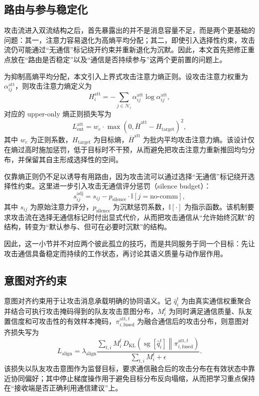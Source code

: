 \subsection{路由与参与稳定化}

攻击流进入双流结构之后，首先暴露出的并不是消息容量不足，而是两个更基础的问题：其一，注意力容易退化为高熵平均分配；其二，即使引入选择性约束，攻击流仍可能通过“无通信”标记绕开约束并重新退化为沉默。因此，本文首先把修正重点放在“路由是否稳定”以及“通信是否持续参与”这两个更前置的问题上。

为抑制高熵平均分配，本文引入上界式攻击注意力熵正则。设攻击注意力权重为 $\alpha^{\text{att}}_{ij}$，则攻击注意力熵定义为
\begin{equation}
H^{\text{att}}_i = -\sum_{j\in\mathcal{N}_i} \alpha^{\text{att}}_{ij} \log \alpha^{\text{att}}_{ij},
\end{equation}
对应的 upper-only 熵正则损失写为
\begin{equation}
L_{\text{ent}}^{\text{att}} = w_e \cdot \max(0, \bar{H}^{\text{att}} - H_{\text{target}})^2,
\end{equation}
其中 $w_e$ 为正则系数，$H_{\text{target}}$ 为目标熵，$\bar{H}^{\text{att}}$ 为批内平均攻击注意力熵。该设计仅在熵过高时施加惩罚，低于目标时不干预，从而避免把攻击注意力重新推回均匀分布，并保留其自主形成选择性的空间。

仅靠熵正则仍不足以诱导有用路由，因为攻击流可以通过选择“无通信”标记绕开选择性约束。这里进一步引入攻击无通信评分惩罚（silence budget）：
\begin{equation}
s_{ij}^{\text{adj}} = s_{ij} - p_{\text{silence}} \cdot \mathbb{I}[j = \text{no-comm}],
\end{equation}
其中 $s_{ij}$ 为原始注意力评分，$p_{\text{silence}}$ 为沉默惩罚系数，$\mathbb{I}[\cdot]$ 为指示函数。该机制要求攻击流在选择无通信标记时付出显式代价，从而把攻击通信从“允许始终沉默”的结构，转变为“默认参与、但可在必要时沉默”的结构。

因此，这一小节并不对应两个彼此孤立的技巧，而是共同服务于同一个目标：先让攻击通信具备稳定而持续的工作状态，再讨论其语义质量与动作层作用。

\subsection{意图对齐约束}

意图对齐约束用于让攻击消息承载明确的协同语义。记 \(\hat{q}_i^t\) 为由真实通信权重聚合并结合可执行攻击掩码得到的队友攻击意图分布，\(M_i^t\) 为同时满足通信质量、队友置信度和可攻击性的有效样本掩码，\(\pi_{i,\text{fused}}^{\text{att},t}\) 为融合通信后的攻击分布，则意图对齐损失写为
\begin{equation}
L_{\text{align}}
=
\lambda_{\text{align}}
\frac{
\sum_{t,i}
M_i^t\,
D_{\mathrm{KL}}
\left(
\operatorname{sg}\!\left[\hat{q}_i^t\right]
\middle\|
\pi_{i,\text{fused}}^{\text{att},t}
\right)
}{
\sum_{t,i} M_i^t + \epsilon
}.
\end{equation}
该损失以队友攻击意图作为监督目标，要求通信融合后的攻击分布在有效状态中靠近协同偏好；其中停止梯度操作用于避免目标分布反向塌缩，从而把学习重点保持在“接收端是否正确利用通信建议”上。

